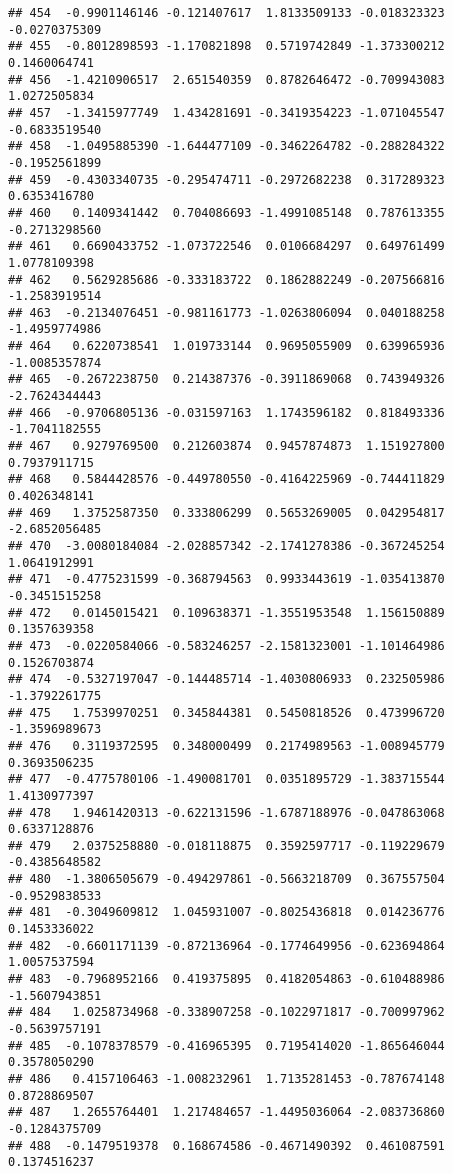 \documentclass[
]{article}
\begin{document}
\begin{verbatim}
## 454  -0.9901146146 -0.121407617  1.8133509133 -0.018323323 -0.0270375309
## 455  -0.8012898593 -1.170821898  0.5719742849 -1.373300212  0.1460064741
## 456  -1.4210906517  2.651540359  0.8782646472 -0.709943083  1.0272505834
## 457  -1.3415977749  1.434281691 -0.3419354223 -1.071045547 -0.6833519540
## 458  -1.0495885390 -1.644477109 -0.3462264782 -0.288284322 -0.1952561899
## 459  -0.4303340735 -0.295474711 -0.2972682238  0.317289323  0.6353416780
## 460   0.1409341442  0.704086693 -1.4991085148  0.787613355 -0.2713298560
## 461   0.6690433752 -1.073722546  0.0106684297  0.649761499  1.0778109398
## 462   0.5629285686 -0.333183722  0.1862882249 -0.207566816 -1.2583919514
## 463  -0.2134076451 -0.981161773 -1.0263806094  0.040188258 -1.4959774986
## 464   0.6220738541  1.019733144  0.9695055909  0.639965936 -1.0085357874
## 465  -0.2672238750  0.214387376 -0.3911869068  0.743949326 -2.7624344443
## 466  -0.9706805136 -0.031597163  1.1743596182  0.818493336 -1.7041182555
## 467   0.9279769500  0.212603874  0.9457874873  1.151927800  0.7937911715
## 468   0.5844428576 -0.449780550 -0.4164225969 -0.744411829  0.4026348141
## 469   1.3752587350  0.333806299  0.5653269005  0.042954817 -2.6852056485
## 470  -3.0080184084 -2.028857342 -2.1741278386 -0.367245254  1.0641912991
## 471  -0.4775231599 -0.368794563  0.9933443619 -1.035413870 -0.3451515258
## 472   0.0145015421  0.109638371 -1.3551953548  1.156150889  0.1357639358
## 473  -0.0220584066 -0.583246257 -2.1581323001 -1.101464986  0.1526703874
## 474  -0.5327197047 -0.144485714 -1.4030806933  0.232505986 -1.3792261775
## 475   1.7539970251  0.345844381  0.5450818526  0.473996720 -1.3596989673
## 476   0.3119372595  0.348000499  0.2174989563 -1.008945779  0.3693506235
## 477  -0.4775780106 -1.490081701  0.0351895729 -1.383715544  1.4130977397
## 478   1.9461420313 -0.622131596 -1.6787188976 -0.047863068  0.6337128876
## 479   2.0375258880 -0.018118875  0.3592597717 -0.119229679 -0.4385648582
## 480  -1.3806505679 -0.494297861 -0.5663218709  0.367557504 -0.9529838533
## 481  -0.3049609812  1.045931007 -0.8025436818  0.014236776  0.1453336022
## 482  -0.6601171139 -0.872136964 -0.1774649956 -0.623694864  1.0057537594
## 483  -0.7968952166  0.419375895  0.4182054863 -0.610488986 -1.5607943851
## 484   1.0258734968 -0.338907258 -0.1022971817 -0.700997962 -0.5639757191
## 485  -0.1078378579 -0.416965395  0.7195414020 -1.865646044  0.3578050290
## 486   0.4157106463 -1.008232961  1.7135281453 -0.787674148  0.8728869507
## 487   1.2655764401  1.217484657 -1.4495036064 -2.083736860 -0.1284375709
## 488  -0.1479519378  0.168674586 -0.4671490392  0.461087591  0.1374516237

\end{verbatim}
\end{document}
